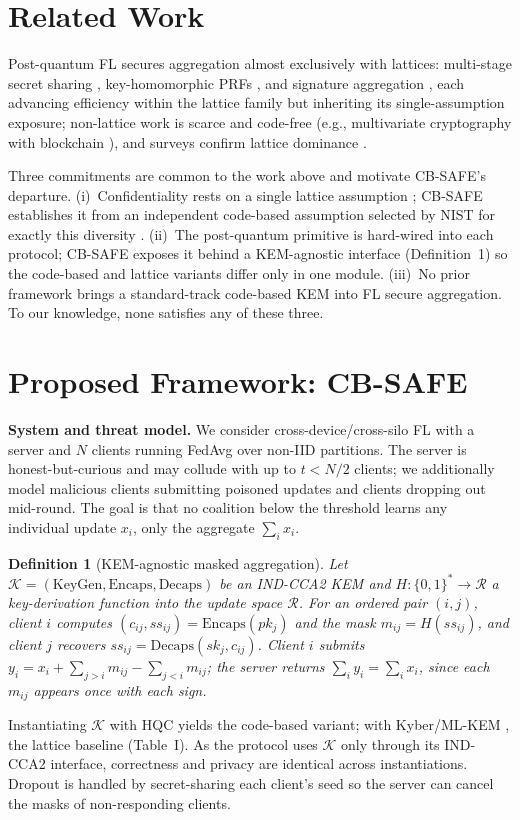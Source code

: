 \documentclass[conference]{IEEEtran}
\newtheorem{definition}{Definition}
\begin{document}
\section{Related Work}
Post-quantum FL secures aggregation almost exclusively with lattices: multi-stage secret sharing
\cite{pqsf2024}, key-homomorphic PRFs \cite{qinxu2025}, and signature aggregation
\cite{narsimhulu2026}, each advancing efficiency within the lattice family but inheriting its
single-assumption exposure; non-lattice work is scarce and code-free (e.g., multivariate
cryptography with blockchain \cite{singh2025pqfog}), and surveys confirm lattice dominance
\cite{nguyen2025lattice}.

Three commitments are common to the work above and motivate CB-SAFE's departure.
(i)~Confidentiality rests on a single lattice assumption \cite{pqsf2024,qinxu2025,narsimhulu2026};
CB-SAFE establishes it from an independent code-based assumption selected by NIST for exactly this
diversity \cite{nistir8545}. (ii)~The post-quantum primitive is hard-wired into each protocol;
CB-SAFE exposes it behind a KEM-agnostic interface (Definition~1) so the code-based and lattice
variants differ only in one module. (iii)~No prior framework brings a standard-track code-based KEM
into FL secure aggregation. To our knowledge, none satisfies any of these three.

\section{Proposed Framework: CB-SAFE}
\textbf{System and threat model.} We consider cross-device/cross-silo FL with a server and $N$
clients running FedAvg over non-IID partitions. The server is honest-but-curious and may collude
with up to $t<N/2$ clients; we additionally model malicious clients submitting poisoned updates and
clients dropping out mid-round. The goal is that no coalition below the threshold learns any
individual update $x_i$, only the aggregate $\sum_i x_i$.

\begin{definition}[KEM-agnostic masked aggregation]
Let $\mathcal{K}=(\mathrm{KeyGen},\mathrm{Encaps},\mathrm{Decaps})$ be an IND-CCA2 KEM and
$H:\{0,1\}^*\!\to\mathcal{R}$ a key-derivation function into the update space $\mathcal{R}$. For an
ordered pair $(i,j)$, client $i$ computes $(c_{ij},ss_{ij})=\mathrm{Encaps}(pk_j)$ and the mask
$m_{ij}=H(ss_{ij})$, and client $j$ recovers $ss_{ij}=\mathrm{Decaps}(sk_j,c_{ij})$. Client $i$
submits $y_i = x_i + \sum_{j>i} m_{ij} - \sum_{j<i} m_{ij}$; the server returns
$\sum_i y_i = \sum_i x_i$, since each $m_{ij}$ appears once with each sign.
\end{definition}
Instantiating $\mathcal{K}$ with HQC yields the code-based variant; with Kyber/ML-KEM
\cite{fips203}, the lattice baseline (Table~I). As the protocol uses $\mathcal{K}$ only through its
IND-CCA2 interface, correctness and privacy are identical across instantiations. Dropout is handled
by secret-sharing each client's seed so the server can cancel the masks of non-responding clients.
\end{document}
